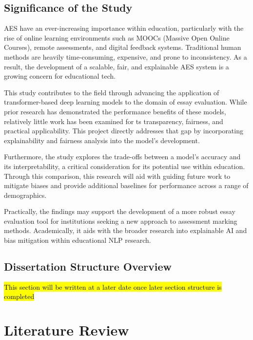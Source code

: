 \documentclass[8pt]{report}
\begin{document}
\section{Significance of the Study}
AES have an ever-increasing importance within education, particularly with the rise of online learning environments such as MOOCs (Massive Open Online Courses), remote assessments, and digital feedback systems. Traditional human methods are heavily time-consuming, 
expensive, and prone to inconsistency. As a result, the development of a scalable, fair, and explainable AES system is a growing concern for educational tech.

This study contributes to the field through advancing the application of transformer-based deep learning models to the domain of essay evaluation. While prior research has demonstrated the performance benefits of these models, relatively little work has been examined for 
ts transparency, fairness, and practical applicability. This project directly addresses that gap by incorporating explainability and fairness analysis into the model’s development.

Furthermore, the study explores the trade-offs between a model’s accuracy and its interpretability, a critical consideration for its potential use within education. Through this comparison, this research will aid with guiding future work to mitigate biases and provide 
additional baselines for performance across a range of demographics.

Practically, the findings may support the development of a more robust essay evaluation tool for institutions seeking a new approach to assessment marking methods. Academically, it aids with the broader research into explainable AI and bias mitigation within educational NLP research.


\section{Dissertation Structure Overview}
\hl{This section will be written at a later date once later section structure is completed}

\chapter{Literature Review}
\end{document}
